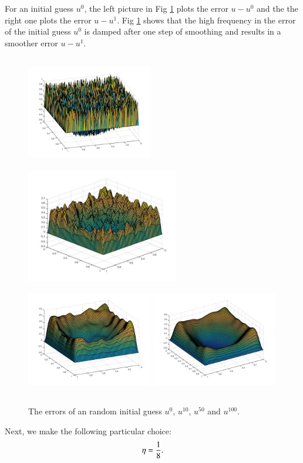 For an initial guess $u^0$, the left picture in Fig \ref{fig:smooth} plots the error $u-u^0$ and the the right one plots the error $u-u^1$. Fig \ref{fig:smooth} shows that the high frequency in the error of the initial guess $u^0$ is damped after one step of smoothing and results in a smoother error $u-u^1$.
\begin{figure}
\centering
\includegraphics[width=5.5cm,height=5cm]{pictures/smooth0.jpg} \quad
\includegraphics[width=5.5 cm,height=5cm]{pictures/smooth10.jpg}\quad
\includegraphics[width=5.5cm,height=5cm]{pictures/smooth50.jpg}\quad
\includegraphics[width=5.5cm,height=5cm]{pictures/smooth100.jpg}
\caption{\footnotesize{The errors of an random initial guess $u^0$, $u^{10}$, $u^{50}$ and  $u^{100}$.}}
\label{fig:smooth}
\end{figure}
Next, we make the following particular choice:
\begin{equation}
  \label{eta}
\eta={1\over 8}.  
\end{equation}

